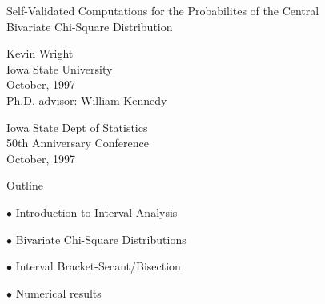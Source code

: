 \documentclass{slides}
\begin{document}
\begin{slide}
\begin{center}
Self-Validated Computations for the Probabilites of the Central \\
Bivariate Chi-Square Distribution\\  
\vspace{2 in}

Kevin Wright \\
Iowa State University\\
October, 1997 \\
\vspace{1 in}
Ph.D. advisor: William Kennedy

\vspace{1 in}
Iowa State Dept of Statistics\\
50th Anniversary Conference\\
October, 1997
\end{center}
\end{slide}
\begin{slide}

\begin{center}
Outline
\end{center}

$\bullet$ Introduction to Interval Analysis

$\bullet$ Bivariate Chi-Square Distributions

$\bullet$ Interval Bracket-Secant/Bisection 

$\bullet$ Numerical results

\end{slide}
\end{document}
